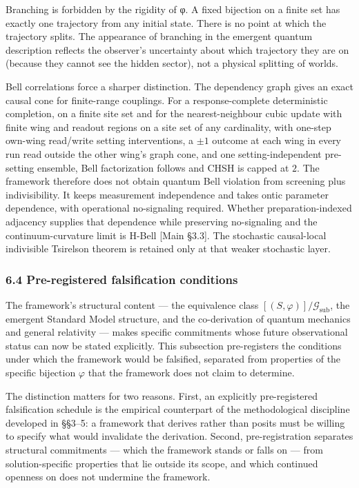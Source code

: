 \documentclass[
]{article}
\begin{document}
Branching is forbidden by the rigidity of φ. A fixed bijection on a
finite set has exactly one trajectory from any initial state. There is
no point at which the trajectory splits. The appearance of branching in
the emergent quantum description reflects the observer's uncertainty
about which trajectory they are on (because they cannot see the hidden
sector), not a physical splitting of worlds.

Bell correlations force a sharper distinction. The dependency graph
gives an exact causal cone for finite-range couplings. For a
response-complete deterministic completion, on a finite site set and for
the nearest-neighbour cubic update with finite wing and readout regions
on a site set of any cardinality, with one-step own-wing read/write
setting interventions, a \(\pm1\) outcome at each wing in every run read
outside the other wing's graph cone, and one setting-independent
pre-setting ensemble, Bell factorization follows and CHSH is capped at
\(2\). The framework therefore does not obtain quantum Bell violation
from screening plus indivisibility. It keeps measurement independence
and takes ontic parameter dependence, with operational no-signaling
required. Whether preparation-indexed adjacency supplies that dependence
while preserving no-signaling and the continuum-curvature limit is
H-Bell {[}Main §3.3{]}. The stochastic causal-local indivisible
Tsirelson theorem is retained only at that weaker stochastic layer.

\hypertarget{pre-registered-falsification-conditions}{%
\subsubsection{6.4 Pre-registered falsification
conditions}\label{pre-registered-falsification-conditions}}

The framework's structural content --- the equivalence class
\([(S, \varphi)]/\mathcal{G}_{\text{sub}}\), the emergent Standard Model
structure, and the co-derivation of quantum mechanics and general
relativity --- makes specific commitments whose future observational
status can now be stated explicitly. This subsection pre-registers the
conditions under which the framework would be falsified, separated from
properties of the specific bijection \(\varphi\) that the framework does
not claim to determine.

The distinction matters for two reasons. First, an explicitly
pre-registered falsification schedule is the empirical counterpart of
the methodological discipline developed in §§3--5: a framework that
derives rather than posits must be willing to specify what would
invalidate the derivation. Second, pre-registration separates structural
commitments --- which the framework stands or falls on --- from
solution-specific properties that lie outside its scope, and which
continued openness on does not undermine the framework.
\end{document}
